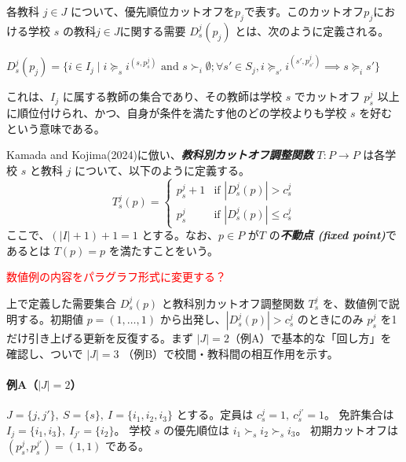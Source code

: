 \documentclass[12pt, a4paper]{article}
\theoremstyle{definition}
\theoremstyle{remark}
\theoremstyle{plain}
\begin{document}

各教科 $j \in J$ について、優先順位カットオフを$p_j$で表す。このカットオフ$p_j$における学校 $s$ の教科$j \in J$に関する需要 $D^j_s(p_j)$ とは、次のように定義される。

$D^j_s(p_j) = \{ i \in I_j \mid i \succeq_s i^{(s,p^j_s)} \text{ and } s \succ_i \emptyset; \forall s' \in S_j, i \succeq_{s'} i^{(s',p^j_{s'})} \implies s \succeq_i s' \}$

これは、$I_j$ に属する教師の集合であり、その教師は学校 $s$ でカットオフ $p^j_s$ 以上に順位付けられ、かつ、自身が条件を満たす他のどの学校よりも学校 $s$ を好むという意味である。

Kamada and Kojima(2024)に倣い、\textbf{\textit{教科別カットオフ調整関数}} $T : P \rightarrow P$ は各学校 $s$ と教科 $j$ について、以下のように定義する。
\[
T_s^j(p) =
\begin{cases}
p_s^j + 1 & \text{if } | D_s^j(p) | > c^j_s \\
p_s^j     & \text{if } | D_s^j(p) | \leq c^j_s
\end{cases}
\]
ここで、\( (|I| + 1) + 1 = 1 \) とする。なお、$p\in P$ が$T$ の\textbf{\textit{不動点 (fixed point)}}であるとは $T(p)=p$ を満たすことをいう。

\textcolor{red}{数値例の内容をパラグラフ形式に変更する？}


\noindent 上で定義した需要集合 $D^j_s(p)$ と教科別カットオフ調整関数 $T^j_s$ を、数値例で説明する。初期値 $p=(1,\dots,1)$ から出発し、$|D^j_s(p)|>c^j_s$ のときにのみ $p^j_s$ を1だけ引き上げる更新を反復する。まず $|J|=2$（例A）で基本的な「回し方」を確認し、ついで $|J|=3$ （例B）で校間・教科間の相互作用を示す。


\paragraph{例A（\(|J|=2\)）}
\(
J=\{j,j'\},\ S=\{s\},\ I=\{i_1,i_2,i_3\}
\) とする。定員は
\(
c^j_s=1,\ c^{j'}_s=1
\)。
免許集合は
\(
I_j=\{i_1,i_3\},\ I_{j'}=\{i_2\}
\)。
学校 \(s\) の優先順位は
\(
i_1 \succ_s i_2 \succ_s i_3
\)。
初期カットオフは
\(
(p^j_s,p^{j'}_s)=(1,1)
\)
である。

\end{document}
